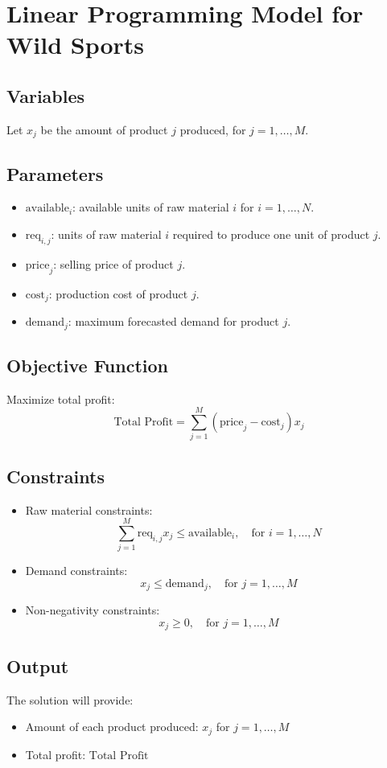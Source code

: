 \documentclass{article}
\begin{document}
\section*{Linear Programming Model for Wild Sports}

\subsection*{Variables}
Let \( x_j \) be the amount of product \( j \) produced, for \( j = 1, \ldots, M \).

\subsection*{Parameters}
\begin{itemize}
    \item \( \text{available}_i \): available units of raw material \( i \) for \( i = 1, \ldots, N \).
    \item \( \text{req}_{i,j} \): units of raw material \( i \) required to produce one unit of product \( j \).
    \item \( \text{price}_j \): selling price of product \( j \).
    \item \( \text{cost}_j \): production cost of product \( j \).
    \item \( \text{demand}_j \): maximum forecasted demand for product \( j \).
\end{itemize}

\subsection*{Objective Function}
Maximize total profit:
\[
\text{Total Profit} = \sum_{j=1}^{M} ( \text{price}_j - \text{cost}_j ) x_j
\]

\subsection*{Constraints}
\begin{itemize}
    \item Raw material constraints:
    \[
    \sum_{j=1}^{M} \text{req}_{i,j} x_j \leq \text{available}_i, \quad \text{for } i = 1, \ldots, N
    \]
    
    \item Demand constraints:
    \[
    x_j \leq \text{demand}_j, \quad \text{for } j = 1, \ldots, M
    \]
    
    \item Non-negativity constraints:
    \[
    x_j \geq 0, \quad \text{for } j = 1, \ldots, M
    \]
\end{itemize}

\subsection*{Output}
The solution will provide:
\begin{itemize}
    \item Amount of each product produced: \( x_j \) for \( j = 1, \ldots, M \)
    \item Total profit: \( \text{Total Profit} \)
\end{itemize}
\end{document}
